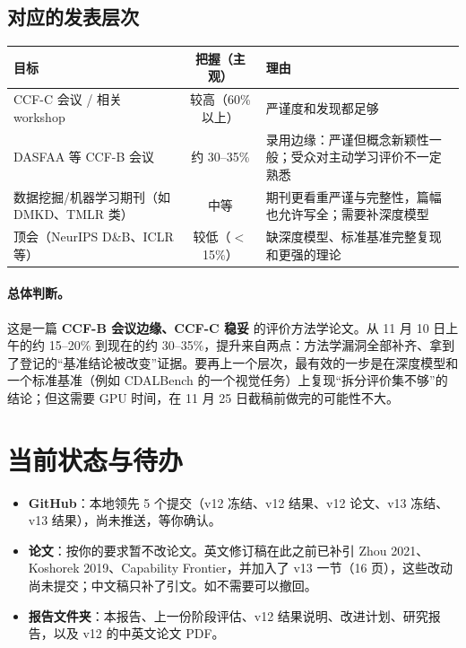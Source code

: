 \documentclass[11pt,a4paper]{article}
\begin{document}
\subsection{对应的发表层次}
\begin{table}[H]
\centering\small
\begin{tabular}{L{5.2cm}cL{7.2cm}}
\toprule
目标 & 把握（主观） & 理由 \\
\midrule
CCF-C 会议 / 相关 workshop & 较高（60\% 以上） & 严谨度和发现都足够 \\
DASFAA 等 CCF-B 会议 & 约 30--35\% & 录用边缘：严谨但概念新颖性一般；受众对主动学习评价不一定熟悉 \\
数据挖掘/机器学习期刊（如 DMKD、TMLR 类） & 中等 & 期刊更看重严谨与完整性，篇幅也允许写全；需要补深度模型 \\
顶会（NeurIPS D\&B、ICLR 等） & 较低（$<$15\%） & 缺深度模型、标准基准完整复现和更强的理论 \\
\bottomrule
\end{tabular}
\end{table}

\paragraph{总体判断。}这是一篇 \textbf{CCF-B 会议边缘、CCF-C 稳妥} 的评价方法学论文。从 11 月 10 日上午的约 15--20\% 到现在的约 30--35\%，提升来自两点：方法学漏洞全部补齐、拿到了登记的“基准结论被改变”证据。要再上一个层次，最有效的一步是在深度模型和一个标准基准（例如 CDALBench 的一个视觉任务）上复现“拆分评价集不够”的结论；但这需要 GPU 时间，在 11 月 25 日截稿前做完的可能性不大。

\section{当前状态与待办}
\begin{itemize}
\item \textbf{GitHub}：本地领先 5 个提交（v12 冻结、v12 结果、v12 论文、v13 冻结、v13 结果），尚未推送，等你确认。
\item \textbf{论文}：按你的要求暂不改论文。英文修订稿在此之前已补引 Zhou 2021、Koshorek 2019、Capability Frontier，并加入了 v13 一节（16 页），这些改动尚未提交；中文稿只补了引文。如不需要可以撤回。
\item \textbf{报告文件夹}：本报告、上一份阶段评估、v12 结果说明、改进计划、研究报告，以及 v12 的中英文论文 PDF。
\end{itemize}
\end{document}
